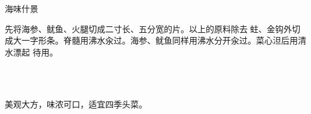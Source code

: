 \begin{recipe}{海味什景}

\ingredients


\preparation

\step 先将海参、鱿鱼、火腿切成二寸长、五分宽的片。以上的原料除去𧎼蛀、金钩外切
成大一字形条。脊髓用沸水汆过。海参、鱿鱼同样用沸水分开汆过。菜心泹后用清水漂起
待用。

\step 𧎼蛀放在蒸碗内上笼大火蒸𤆵，将锅放在旺火上，放下猪油，再放入姜葱，爆出香
味后，倒入鸡汤、盐、糖汁、料酒、酱油、花椒、胡椒及以上用沸水汆过的原材料（除鱿
鱼、海参、脊髓、小菜外）小火烧𤆵。再将小菜泹𤆵后，在白油锅内煸过，起锅垫入走菜
盘内。再将烧𤆵后的一字条，捞入盘内放在小菜上边。鱿鱼、脊髓，放在烧一字条等原料
的原汁内，烧上味打入盘内放在一字条块上边。再放入海参于原汁内烧上味，勾入豆粉，
起锅淋入盘内，海参放在鱿鱼、脊髓上面上席。

\features

美观大方，味浓可口，适宜四季头菜。

\end{recipe}

